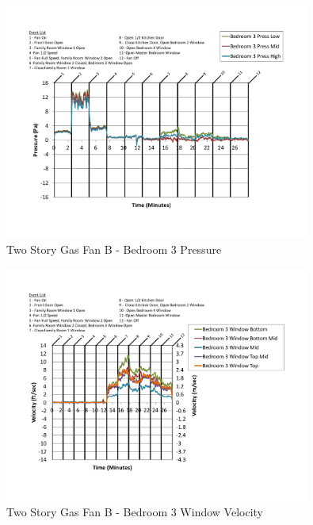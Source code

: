 \documentclass{article}
\begin{document}
\begin{appendices}
	\begin{figure}[H]
		\centering
		\includegraphics[height=3.05in,trim=0.67in 1.1in 0.67in 0.8in,clip=true]{0_Images/Results_Charts/ColdFlow/Two_Story/Gas/B/Bedroom_3_Pressure.pdf}
		\caption{Two Story Gas Fan B - Bedroom 3 Pressure}
	\end{figure}
 

	\begin{figure}[H]
		\centering
		\includegraphics[height=3.05in,trim=0.67in 1.1in 0.67in 0.8in,clip=true]{0_Images/Results_Charts/ColdFlow/Two_Story/Gas/B/Bedroom_3_Window_Velocity.pdf}
		\caption{Two Story Gas Fan B - Bedroom 3 Window Velocity}
	\end{figure}
 
	\clearpage


\end{appendices}
\end{document}
